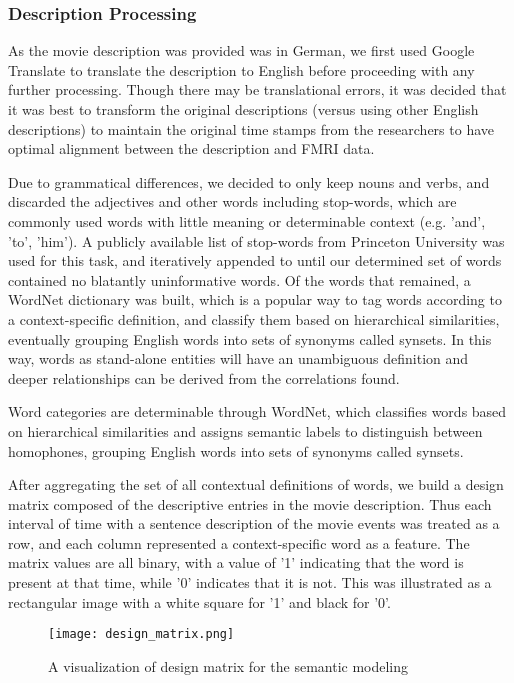 \subsubsection{Description Processing}
\par As the movie description was provided was in German, we first used Google
Translate to translate the description to English before proceeding with 
any further processing. Though there may be translational errors, it was decided that it was best to transform the original descriptions (versus using other English descriptions) to maintain the original time stamps from the researchers to have optimal alignment between the description and FMRI data.

\par Due to grammatical differences, we decided to only keep nouns and verbs, and discarded the adjectives and other words including stop-words, which are commonly used words with little meaning or determinable context (e.g. 'and', 'to', 'him'). A publicly available list of stop-words from Princeton University was used for this task, and iteratively appended to until our determined set of words contained no blatantly uninformative words. Of the words that remained, a WordNet dictionary was built, which is a popular way to tag words according to a context-specific definition, and classify them based on hierarchical similarities, eventually grouping English words into sets of synonyms called synsets. In this way, words as stand-alone entities will have an unambiguous definition and deeper relationships can be derived from the correlations found. 

 \par Word categories are determinable through WordNet, which classifies words based on hierarchical similarities and assigns semantic labels to distinguish between homophones, grouping English words into sets of synonyms called synsets.  
 \par After aggregating the set of all contextual definitions of words,
 we build a design matrix composed of the descriptive entries in the movie description. Thus each interval of time with a sentence description of the movie events was treated as a row, and each column represented a context-specific word as a feature. The matrix values are all binary, with a value of '1' indicating that the word is present at that time, while '0' indicates that it is not. This was illustrated as a rectangular image with a white square for '1' and black for '0'. 

\begin{figure}[!htbp]
\centering
\texttt{[image: design\_matrix.png]}
\caption{\label{fig:design_matrix} A visualization of design matrix for the semantic modeling}
\end{figure}

